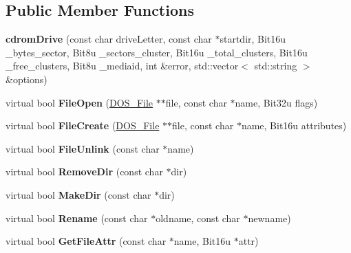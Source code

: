 \subsection*{Public Member Functions}
\begin{DoxyCompactItemize}
\item 
\hypertarget{classcdromDrive_a6322c0aa3674876948028ddceb3105b8}{{\bfseries cdrom\-Drive} (const char drive\-Letter, const char $\ast$startdir, Bit16u \-\_\-bytes\-\_\-sector, Bit8u \-\_\-sectors\-\_\-cluster, Bit16u \-\_\-total\-\_\-clusters, Bit16u \-\_\-free\-\_\-clusters, Bit8u \-\_\-mediaid, int \&error, std\-::vector$<$ std\-::string $>$ \&options)}\label{classcdromDrive_a6322c0aa3674876948028ddceb3105b8}

\item 
\hypertarget{classcdromDrive_aa5ff41c5c9c045550b6f1a0974aa8d1d}{virtual bool {\bfseries File\-Open} (\hyperlink{classDOS__File}{D\-O\-S\-\_\-\-File} $\ast$$\ast$file, const char $\ast$name, Bit32u flags)}\label{classcdromDrive_aa5ff41c5c9c045550b6f1a0974aa8d1d}

\item 
\hypertarget{classcdromDrive_ac7c844b8ced8b687886f1fa5e6b9c5e4}{virtual bool {\bfseries File\-Create} (\hyperlink{classDOS__File}{D\-O\-S\-\_\-\-File} $\ast$$\ast$file, const char $\ast$name, Bit16u attributes)}\label{classcdromDrive_ac7c844b8ced8b687886f1fa5e6b9c5e4}

\item 
\hypertarget{classcdromDrive_a0e4ec60ab003c1cc1b687bc2ddef9d8a}{virtual bool {\bfseries File\-Unlink} (const char $\ast$name)}\label{classcdromDrive_a0e4ec60ab003c1cc1b687bc2ddef9d8a}

\item 
\hypertarget{classcdromDrive_ae5a43f4860af4338c8efe8102489ede2}{virtual bool {\bfseries Remove\-Dir} (const char $\ast$dir)}\label{classcdromDrive_ae5a43f4860af4338c8efe8102489ede2}

\item 
\hypertarget{classcdromDrive_a6a8f1604c680ab386f60d777f248eb78}{virtual bool {\bfseries Make\-Dir} (const char $\ast$dir)}\label{classcdromDrive_a6a8f1604c680ab386f60d777f248eb78}

\item 
\hypertarget{classcdromDrive_abf672051a5e5e3b4637f4f976ed0c6cb}{virtual bool {\bfseries Rename} (const char $\ast$oldname, const char $\ast$newname)}\label{classcdromDrive_abf672051a5e5e3b4637f4f976ed0c6cb}

\item 
\hypertarget{classcdromDrive_aba4f6b7a2df7be93c754232dff50c23c}{virtual bool {\bfseries Get\-File\-Attr} (const char $\ast$name, Bit16u $\ast$attr)}\label{classcdromDrive_aba4f6b7a2df7be93c754232dff50c23c}


\end{DoxyCompactItemize}
